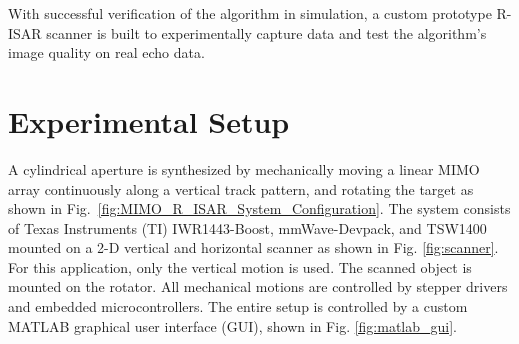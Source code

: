 \documentclass[conference]{IEEEtran}
\begin{document}
		With successful verification of the algorithm in simulation, a custom prototype R-ISAR scanner is built to experimentally capture data and test the algorithm's image quality on real echo data.
		
		\section{Experimental Setup}
		\label{sec:experimental_setup}
		
		A cylindrical aperture is synthesized by mechanically moving a linear MIMO array continuously along a vertical track pattern, and rotating the target as shown in Fig.~\ref{fig:MIMO_R_ISAR_System_Configuration}. The system consists of Texas Instruments (TI) IWR1443-Boost, mmWave-Devpack, and TSW1400 mounted on a 2-D vertical and horizontal scanner as shown in Fig. \ref{fig:scanner}. For this application, only the vertical motion is used. The scanned object is mounted on the rotator. All mechanical motions are controlled by stepper drivers and embedded microcontrollers. The entire setup is controlled by a custom MATLAB graphical user interface (GUI), shown in Fig. \ref{fig:matlab_gui}. 
		
\end{document}
